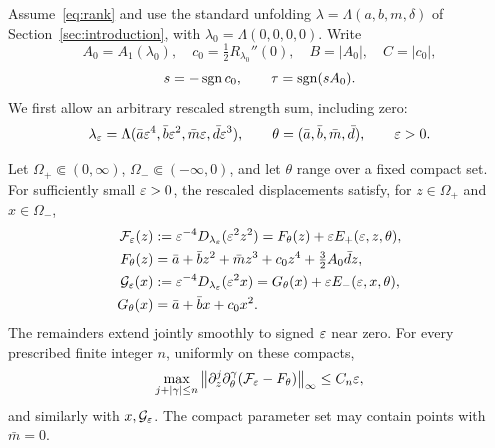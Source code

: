 Assume~\eqref{eq:rank} and use the standard unfolding
\(\lambda=\Lambda(a,b,m,\delta)\) of Section~\ref{sec:introduction}, with
\(\lambda_0=\Lambda(0,0,0,0)\). Write
\[
 A_0=A_1(\lambda_0),\quad
 c_0=\tfrac12R_{\lambda_0}''(0),\quad
 B=|A_0|,\quad C=|c_0|,
\]
\[
 s=-\operatorname{sgn} c_0,\qquad \tau=\operatorname{sgn}(sA_0).
\]
We first allow an arbitrary rescaled strength sum, including zero:
\begin{equation}\label{eq:weighted-general-controls}
 \lambda_\varepsilon=\Lambda(\bar a\varepsilon^4,\bar b\varepsilon^2,
                         \bar m\varepsilon,\bar d\varepsilon^3),\qquad
 \theta=(\bar a,\bar b,\bar m,\bar d),\qquad \varepsilon>0.
\end{equation}

\begin{lemma}\label{lem:weighted-quartic}
Let \(\Omega_+\Subset(0,\infty)\), \(\Omega_-\Subset(-\infty,0)\), and let
\(\theta\) range over a fixed compact set. For sufficiently small
\(\varepsilon>0\), the rescaled displacements satisfy, for \(z\in\Omega_+\)
and \(x\in\Omega_-\),
\begin{align}
 \mathcal F_\varepsilon(z)&:=\varepsilon^{-4}D_{\lambda_\varepsilon}(\varepsilon^2z^2)
 =F_\theta(z)+\varepsilon E_+(\varepsilon,z,\theta),\label{eq:quartic-limit}\\
 F_\theta(z)&=\bar a+\bar bz^2+\bar mz^3+c_0z^4+\tfrac32A_0\bar dz,\notag\\
 \mathcal G_\varepsilon(x)&:=\varepsilon^{-4}D_{\lambda_\varepsilon}(\varepsilon^2x)
 =G_\theta(x)+\varepsilon E_-(\varepsilon,x,\theta),
 \label{eq:quartic-negative-limit}\\
 G_\theta(x)&=\bar a+\bar bx+c_0x^2.\notag
\end{align}
The remainders extend jointly smoothly to signed \(\varepsilon\) near zero.
For every prescribed finite integer \(n\), uniformly on these compacts,
\begin{equation}\label{eq:quartic-mixed-norm}
 \max_{j+|\gamma|\le n}
 \left\|\partial_z^j\partial_\theta^\gamma
                 (\mathcal F_\varepsilon-F_\theta)\right\|_\infty\le C_n\varepsilon,
\end{equation}
and similarly with \(x,\mathcal G_\varepsilon\). The compact parameter set may
contain points with \(\bar m=0\).
\end{lemma}

